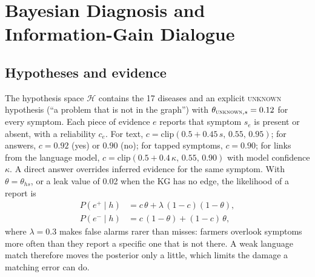 \documentclass[conference]{IEEEtran}
\newcommand{\unk}{\textsc{unknown}}
\begin{document}
\section{Bayesian Diagnosis and Information-Gain Dialogue}
\label{sec:inference}

\subsection{Hypotheses and evidence}
The hypothesis space $\mathcal{H}$ contains the 17 diseases and an explicit \unk{} hypothesis (``a problem that is not in the graph'') with $\theta_{\unk,s}=0.12$ for every symptom. Each piece of evidence $e$ reports that symptom $s_e$ is present or absent, with a reliability $c_e$. For text, $c=\mathrm{clip}(0.5+0.45\,s,\,0.55,\,0.95)$; for answers, $c=0.92$ (yes) or $0.90$ (no); for tapped symptoms, $c=0.90$; for links from the language model, $c=\mathrm{clip}(0.5+0.4\,\kappa,\,0.55,\,0.90)$ with model confidence $\kappa$. A direct answer overrides inferred evidence for the same symptom. With $\theta=\theta_{hs}$, or a leak value of 0.02 when the KG has no edge, the likelihood of a report is
\begin{align}
  P(e^{+}\mid h) &= c\,\theta + \lambda\,(1-c)(1-\theta), \label{eq:pos}\\
  P(e^{-}\mid h) &= c\,(1-\theta) + (1-c)\,\theta, \label{eq:neg}
\end{align}
where $\lambda=0.3$ makes false alarms rarer than misses: farmers overlook symptoms more often than they report a specific one that is not there. A weak language match therefore moves the posterior only a little, which limits the damage a matching error can do.
\end{document}
